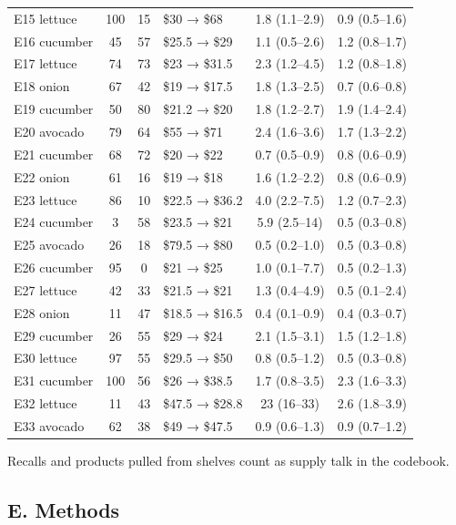 \documentclass[
  11pt,
]{article}
\begin{document}
{\begin{longtable}{lcc>{\centering\arraybackslash}p{2.4cm}cc}
E15 lettuce & 100 & 15 & \$30 → \$68 & 1.8 (1.1--2.9) & 0.9 (0.5--1.6) \\
E16 cucumber & 45 & 57 & \$25.5 → \$29 & 1.1 (0.5--2.6) & 1.2 (0.8--1.7) \\
E17 lettuce & 74 & 73 & \$23 → \$31.5 & 2.3 (1.2--4.5) & 1.2 (0.8--1.8) \\
E18 onion & 67 & 42 & \$19 → \$17.5 & 1.8 (1.3--2.5) & 0.7 (0.6--0.8) \\
E19 cucumber & 50 & 80 & \$21.2 → \$20 & 1.8 (1.2--2.7) & 1.9 (1.4--2.4) \\
E20 avocado & 79 & 64 & \$55 → \$71 & 2.4 (1.6--3.6) & 1.7 (1.3--2.2) \\
E21 cucumber & 68 & 72 & \$20 → \$22 & 0.7 (0.5--0.9) & 0.8 (0.6--0.9) \\
E22 onion & 61 & 16 & \$19 → \$18 & 1.6 (1.2--2.2) & 0.8 (0.6--0.9) \\
E23 lettuce & 86 & 10 & \$22.5 → \$36.2 & 4.0 (2.2--7.5) & 1.2 (0.7--2.3) \\
E24 cucumber & 3 & 58 & \$23.5 → \$21 & 5.9 (2.5--14) & 0.5 (0.3--0.8) \\
E25 avocado & 26 & 18 & \$79.5 → \$80 & 0.5 (0.2--1.0) & 0.5 (0.3--0.8) \\
E26 cucumber & 95 & 0 & \$21 → \$25 & 1.0 (0.1--7.7) & 0.5 (0.2--1.3) \\
E27 lettuce & 42 & 33 & \$21.5 → \$21 & 1.3 (0.4--4.9) & 0.5 (0.1--2.4) \\
E28 onion & 11 & 47 & \$18.5 → \$16.5 & 0.4 (0.1--0.9) & 0.4 (0.3--0.7) \\
E29 cucumber & 26 & 55 & \$29 → \$24 & 2.1 (1.5--3.1) & 1.5 (1.2--1.8) \\
E30 lettuce & 97 & 55 & \$29.5 → \$50 & 0.8 (0.5--1.2) & 0.5 (0.3--0.8) \\
E31 cucumber & 100 & 56 & \$26 → \$38.5 & 1.7 (0.8--3.5) & 2.3 (1.6--3.3) \\
E32 lettuce & 11 & 43 & \$47.5 → \$28.8 & 23 (16--33) & 2.6 (1.8--3.9) \\
E33 avocado & 62 & 38 & \$49 → \$47.5 & 0.9 (0.6--1.3) & 0.9 (0.7--1.2) \\
\end{longtable}
}

Recalls and products pulled from shelves count as supply talk in the codebook.

\subsection{E. Methods}\label{e.-methods}
\end{document}
